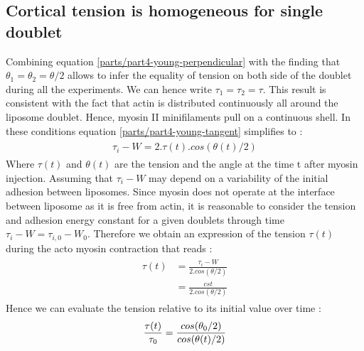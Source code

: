 \documentclass[A4paperpaper,11pt,english]{sphinxmanual}
\begin{document}
\subsection{Cortical tension is homogeneous for single doublet}
\label{parts/part4:cortical-tension-is-homogeneous-for-single-doublet}
Combining equation \eqref{parts/part4-young-perpendicular} with the finding that \(\theta_1 = \theta_2 = \theta
/2\) allows to infer the equality of tension on both side of the doublet during all the
experiments. We can hence write \(\tau_1 = \tau_2 = \tau\). This result is
consistent with the fact that actin is distributed continuously all around the
liposome doublet. Hence, myosin II minifilaments pull on a continuous shell. In
these conditions equation \eqref{parts/part4-young-tangent} simplifies to :
\label{parts/part4:equation-eq3}\begin{gather}
\begin{split}\tau_i - W = 2.\tau(t).cos(\theta(t)/2)\end{split}\label{parts/part4-eq3}
\end{gather}
Where \(\tau(t)\) and \(\theta(t)\) are the tension and the angle at
the time t after myosin injection. Assuming that
\(\tau_i-W\) may depend on a variability of the initial adhesion between
liposomes. Since myosin does not operate at the interface between liposome as
it is free from actin, it is reasonable to consider the tension and
adhesion energy constant for a given doublets through time
\(\tau_i-W = \tau_{i,0}-W_0\).
Therefore we obtain an expression of the tension \(\tau(t)\) during the acto myosin contraction that reads :
\label{parts/part4:equation-eqtime}\begin{gather}
\begin{split}\tau(t) &= \frac{ \tau_i - W }{2.cos(\theta/2)}\\
        &= \frac{ cst           }{2.cos(\theta/2)}\end{split}\label{parts/part4-eqtime}
\end{gather}
Hence we can evaluate the tension relative to its initial value over time :
\begin{gather}
\begin{split}\frac{ \tau(t) }{\tau_0} = \frac{cos(\theta_0/2)}{cos(\theta(t)/2)}\end{split}\notag
\end{gather}
\end{document}
